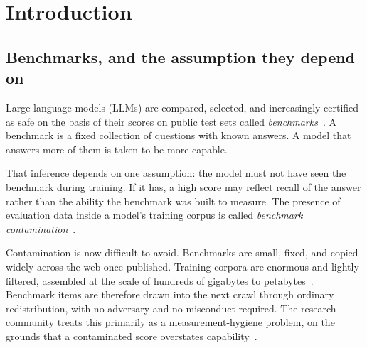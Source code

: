 %

\section{Introduction}
\label{sec:intro}

\subsection{Benchmarks, and the assumption they depend on}
Large language models (LLMs) are compared, selected, and increasingly certified as safe
on the basis of their scores on public test sets called
\emph{benchmarks}~\citep{hendrycks2021mmlu,cobbe2021gsm8k}. A benchmark is a fixed
collection of questions with known answers. A model that answers more of them is taken
to be more capable.

That inference depends on one assumption: the model must not have seen the benchmark
during training. If it has, a high score may reflect recall of the answer rather than
the ability the benchmark was built to measure. The presence of evaluation data inside a
model's training corpus is called \emph{benchmark
contamination}~\citep{golchin2024timetravel}.

Contamination is now difficult to avoid. Benchmarks are small, fixed, and copied widely
across the web once published. Training corpora are enormous and lightly filtered,
assembled at the scale of hundreds of gigabytes to
petabytes~\citep{commoncrawl,gao2020pile}. Benchmark items are therefore drawn into the
next crawl through ordinary redistribution, with no adversary and no misconduct
required. The research community treats this primarily as a measurement-hygiene
problem, on the grounds that a contaminated score overstates
capability~\citep{ravaut2024survey}.

